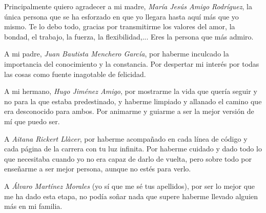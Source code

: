 
Principalmente quiero agradecer a mi madre, \textit{María Jesús Amigo Rodríguez}, la única persona que se ha esforzado en que yo llegara hasta aquí más que yo mismo. Te lo debo todo, gracias por transmitirme los valores del amor, la bondad, el trabajo, la fuerza, la flexibilidad,... Eres la persona que más admiro.

A mi padre, \textit{Juan Bautista Menchero García}, por haberme inculcado la importancia del conocimiento y la constancia. Por despertar mi interés por todas las cosas como fuente inagotable de felicidad.

A mi hermano, \textit{Hugo Jiménez Amigo}, por mostrarme la vida que quería seguir y no para la que estaba predestinado, y haberme limpiado y allanado el camino que era desconocido para ambos. Por animarme y guiarme a ser la mejor versión de mí que puedo ser.

A \textit{Aitana Rickert Llàcer}, por haberme acompañado en cada línea de código y cada página de la carrera con tu luz infinita. Por haberme cuidado y dado todo lo que necesitaba cuando yo no era capaz de darlo de vuelta, pero sobre todo por enseñarme a ser mejor persona, aunque no estés para verlo.

A \textit{Álvaro Martínez Morales} (yo sí que me sé tus apellidos), por ser lo mejor que me ha dado esta etapa, no podía soñar nada que supere haberme llevado alguien más en mi familia.
